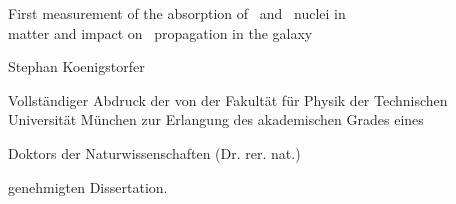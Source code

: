 {%
  \centering %
  \vspace*{\baselineskip} %
  
  
  {{First measurement of the absorption of \ahe\ and \atrit\ nuclei in} \\[0.3\baselineskip] %
	{matter and impact on \ahe\ propagation in the galaxy} \\[1.5\baselineskip]
  }

  
  \scshape %
  
  {Stephan Koenigstorfer}
  
  \vspace*{2\baselineskip} %

	Vollständiger Abdruck der von der Fakultät für Physik der Technischen
	Universität München zur Erlangung des akademischen Grades eines

	\vspace*{2ex}
	Doktors der Naturwissenschaften (Dr. rer. nat.)
	\vspace*{2ex}

	genehmigten Dissertation.

  \vspace*{\fill}

% 
% 
% 

}
